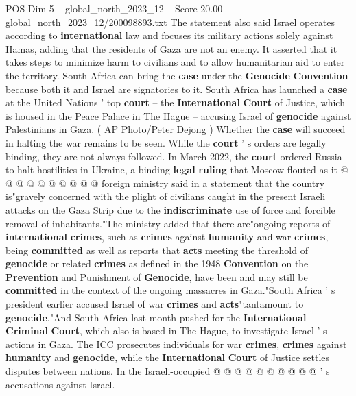 \begin{textsample}{POS Dim 5 – global\_north\_2023\_12 – Score 20.00 – global\_north\_2023\_12/200098893.txt}
The statement also said Israel operates according to \textbf{international} law and focuses its military actions solely against Hamas, adding that the residents of Gaza are not an enemy.
It asserted that it takes steps to minimize harm to civilians and to allow humanitarian aid to enter the territory.
South Africa can bring the \textbf{case} under the \textbf{Genocide} \textbf{Convention} because both it and Israel are signatories to it.
South Africa has launched a \textbf{case} at the United Nations ' top \textbf{court} -- the \textbf{International} \textbf{Court} of Justice, which is housed in the Peace Palace in The Hague -- accusing Israel of \textbf{genocide} against Palestinians in Gaza. ( AP Photo/Peter Dejong ) Whether the \textbf{case} will succeed in halting the war remains to be seen.
While the \textbf{court} ' s orders are legally binding, they are not always followed.
In March 2022, the \textbf{court} ordered Russia to halt hostilities in Ukraine, a binding \textbf{legal} \textbf{ruling} that Moscow flouted as it @ @ @ @ @ @ @ @ @ @ foreign ministry said in a statement that the country is"gravely concerned with the plight of civilians caught in the present Israeli attacks on the Gaza Strip due to the \textbf{indiscriminate} use of force and forcible removal of inhabitants."The ministry added that there are"ongoing reports of \textbf{international} \textbf{crimes}, such as \textbf{crimes} against \textbf{humanity} and war \textbf{crimes}, being \textbf{committed} as well as reports that \textbf{acts} meeting the threshold of \textbf{genocide} or related \textbf{crimes} as defined in the 1948 \textbf{Convention} on the \textbf{Prevention} and Punishment of \textbf{Genocide}, have been and may still be \textbf{committed} in the context of the ongoing massacres in Gaza."South Africa ' s president earlier accused Israel of war \textbf{crimes} and \textbf{acts}"tantamount to \textbf{genocide}."And South Africa last month pushed for the \textbf{International} \textbf{Criminal} \textbf{Court}, which also is based in The Hague, to investigate Israel ' s actions in Gaza.
The ICC prosecutes individuals for war \textbf{crimes}, \textbf{crimes} against \textbf{humanity} and \textbf{genocide}, while the \textbf{International} \textbf{Court} of Justice settles disputes between nations.
In the Israeli-occupied @ @ @ @ @ @ @ @ @ @ ' s accusations against Israel.

\end{textsample}

